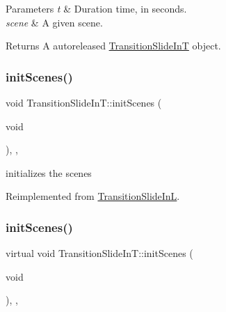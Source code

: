 \begin{DoxyParams}{Parameters}
{\em t} & Duration time, in seconds. \\
\hline
{\em scene} & A given scene. \\
\hline
\end{DoxyParams}
\begin{DoxyReturn}{Returns}
A autoreleased \hyperlink{classTransitionSlideInT}{Transition\+Slide\+InT} object. 
\end{DoxyReturn}
\mbox{\label{classTransitionSlideInT_a3bd7d1724466523acee846e73e42f7d2}} 
\subsubsection{\texorpdfstring{init\+Scenes()}{initScenes()}\hspace{0.1cm}{\footnotesize\ttfamily [1/2]}}
{\footnotesize\ttfamily void Transition\+Slide\+In\+T\+::init\+Scenes (\begin{DoxyParamCaption}\item[{void}]{ }\end{DoxyParamCaption})\hspace{0.3cm}{\ttfamily [override]}, {\ttfamily [protected]}, {\ttfamily [virtual]}}

initializes the scenes 

Reimplemented from \hyperlink{classTransitionSlideInL_abac332ac289d8ed399168d7a428be3b7}{Transition\+Slide\+InL}.

\mbox{\label{classTransitionSlideInT_a974e6dd9c9fe6159497bf3196e383a43}} 
\subsubsection{\texorpdfstring{init\+Scenes()}{initScenes()}\hspace{0.1cm}{\footnotesize\ttfamily [2/2]}}
{\footnotesize\ttfamily virtual void Transition\+Slide\+In\+T\+::init\+Scenes (\begin{DoxyParamCaption}\item[{void}]{ }\end{DoxyParamCaption})\hspace{0.3cm}{\ttfamily [override]}, {\ttfamily [protected]}, {\ttfamily [virtual]}}

